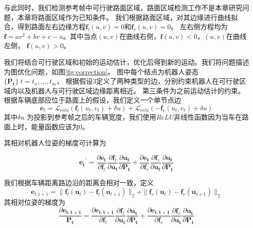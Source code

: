 与此同时，我们检测参考帧中可行驶路面区域，路面区域检测工作不是本章研究问题，本章将路面区域作为已知条件。
我们根据路面区域，对其边缘进行曲线拟合，得到路面左右边缘方程$\mathbf{f}_{l}(u,v)=0$和$\mathbf{f}_r(u,v)=0$。
左右侧方程均为$\mathbf{f} = av^2+bv+c-u$。其中当点$(u,v)$在曲线右侧，$\mathbf{f}(u,v)<0$，$(u,v)$在曲线左侧，
$\mathbf{f}(u,v)>0$。



我们将结合可行驶区域和初始的运动估计，优化后得到新的运动。我们将问题描述为图优化问题，如图\ref{fig:correction}。
图中每个结点为机器人姿态$\{\mathbf{P_{t}}\} \; t=t_n,...,t_m$，
根据假设3定义了两种类型的边，分别约束机器人在可行驶区域内以及机器人与可行驶区域边缘距离相近。
第三条件为之前运动估计的约束。
根据车辆底部应位于路面上的假设，我们定义一个单节点边
\begin{equation}
    \label{eq:vo_correct_dr_unary_edge}
    \mathbf{e}_{t} = \mathcal{L}_{relu}(\mathbf{f}_l(u_t,v_t)+\delta u
    ) + \mathcal{L}_{relu}(-\mathbf{f}_r(u_t,v_t)+\delta u)
\end{equation}
其中$\delta u$ 为投影到参考帧之后的车辆宽度，我们使用$ReLU$非线性函数因为当车在路面上时，能量函数应该为0。

其相对机器人位姿的梯度可计算为

\begin{equation}
    \mathbf{e_t}^{\prime} = \frac{\partial \mathbf{e_t}}{\partial \mathbf{f}_l}
    \frac{\partial \mathbf{f}_l}{\partial \mathbf{u_t}}
    \frac{\partial \mathbf{u_t}}{\partial \mathbf{P_t}}+
    \frac{\partial \mathbf{e_t}}{\partial \mathbf{f}_r}
    \frac{\partial \mathbf{f}_r}{\partial \mathbf{u_t}}
    \frac{\partial \mathbf{u_t}}{\partial \mathbf{P_t}}
\end{equation}

我们根据车辆距离路边沿的距离会相对一致，定义
\begin{equation}
    \label{eq:vo_correct_dr_binary_edge_1}
\mathbf{e}_{t,t+1}= \|\mathbf{f}_l(\mathbf{u}_t)-\mathbf{f}_l(\mathbf{u}_{t+1})\|_2 + \|\mathbf{f}_r(\mathbf{u}_t)-\mathbf{f}_r(\mathbf{u}_{t+1})\|_2
\end{equation}
其相对位姿的梯度为
\begin{equation}
    \frac{\partial\mathbf{e_{t,t+1}}}{\mathbf{P_{t}}} = \frac{\partial\mathbf{e_{t,t+1}}}{\partial \mathbf{f}_l}
    \frac{\partial \mathbf{f}_l}{\partial \mathbf{u_t}}
    \frac{\partial \mathbf{u_t}}{\partial \mathbf{P_t}}+
    \frac{\partial\mathbf{e_{t,t+1}}}{\partial \mathbf{f}_r} 
    \frac{\partial \mathbf{f}_r}{\partial \mathbf{u_t}}
    \frac{\partial \mathbf{u_t}}{\partial \mathbf{P_t}}
\end{equation}


